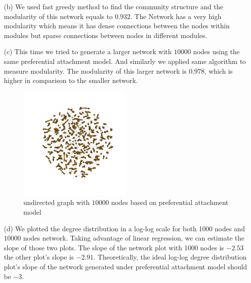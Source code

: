 \documentclass[draftcls,12pt,onecolumn]{IEEEtran}
\begin{document}
(b) We used fast greedy method to find the community structure and the modularity of this network equals to $0.932$. The Network has a very high modularity which means it has dense connections between the nodes within modules but sparse connections between nodes in different modules.

(c) This time we tried to generate a larger network with $10000$ nodes using the same preferential attachment model. And similarly we applied same algorithm to measure modularity. The modularity of this larger network is $0.978$, which is higher in comparison to the smaller network.
\begin{figure}[H]
\centering
\includegraphics[width=0.5\textwidth]{1_2_c_network.png}
\caption{undirected graph with $10000$ nodes based on preferential attachment model}
\end{figure}

(d) We plotted the degree distribution in a log-log scale for both 1000 nodes and $10000$ nodes network. Taking advantage of linear regression, we can estimate the slope of those two plots. The slope of the network plot with 1000 nodes is $-2.53$ the other plot's slope is $-2.91$. Theoretically, the ideal log-log degree distribution plot's slope of the network generated under preferential attachment model should be $-3$.
 
\end{document}
